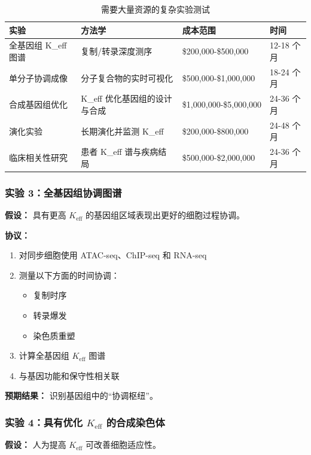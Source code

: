 \documentclass[12pt]{article}
\begin{document}
	\begin{table}[H]
		\centering
		\caption{需要大量资源的复杂实验测试}
		\begin{tabular}{p{4cm}p{5cm}p{3cm}p{2cm}}
			\toprule
			\textbf{实验} & \textbf{方法学} & \textbf{成本范围} & \textbf{时间} \\
			\midrule
			全基因组 K\_eff 图谱 & 复制/转录深度测序 & \$200,000-\$500,000 & 12-18 个月 \\
			单分子协调成像 & 分子复合物的实时可视化 & \$500,000-\$1,000,000 & 18-24 个月 \\
			合成基因组优化 & K\_eff 优化基因组的设计与合成 & \$1,000,000-\$5,000,000 & 24-36 个月 \\
			演化实验 & 长期演化并监测 K\_eff & \$200,000-\$800,000 & 24-48 个月 \\
			临床相关性研究 & 患者 K\_eff 谱与疾病结局 & \$500,000-\$2,000,000 & 24-36 个月 \\
			\bottomrule
		\end{tabular}
	\end{table}
	
	\subsubsection{实验 3：全基因组协调图谱}
	\textbf{假设：} 具有更高 $K_{\text{eff}}$ 的基因组区域表现出更好的细胞过程协调。
	
	\textbf{协议：}
	\begin{enumerate}
		\item 对同步细胞使用 ATAC-seq、ChIP-seq 和 RNA-seq
		\item 测量以下方面的时间协调：
		\begin{itemize}
			\item 复制时序
			\item 转录爆发
			\item 染色质重塑
		\end{itemize}
		\item 计算全基因组 $K_{\text{eff}}$ 图谱
		\item 与基因功能和保守性相关联
	\end{enumerate}
	
	\textbf{预期结果：} 识别基因组中的“协调枢纽”。
	
	\subsubsection{实验 4：具有优化 $K_{\text{eff}}$ 的合成染色体}
	\textbf{假设：} 人为提高 $K_{\text{eff}}$ 可改善细胞适应性。
	
\end{document}
